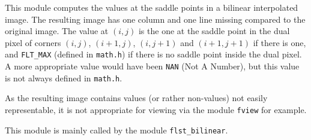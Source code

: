 This module computes the values at the saddle points 
 in a bilinear interpolated image. 
The resulting image has one column and one line missing
compared to the original image. The value at $(i,j)$ is the one at the saddle
point in the dual pixel of corners $(i,j)$, $(i+1,j)$, $(i,j+1)$ and
$(i+1,j+1)$ if there is one, and \texttt{FLT\_MAX} (defined in \texttt{math.h})
if there is no saddle point inside the dual pixel. A more appropriate value
would have been \texttt{NAN} (Not A Number), but this value is not always
defined in \texttt{math.h}.

As the resulting image contains values (or rather non-values) not easily
representable, it is not appropriate for viewing via the module \texttt{fview}
for example.

This module is mainly called by the module \texttt{flst\_bilinear}.
